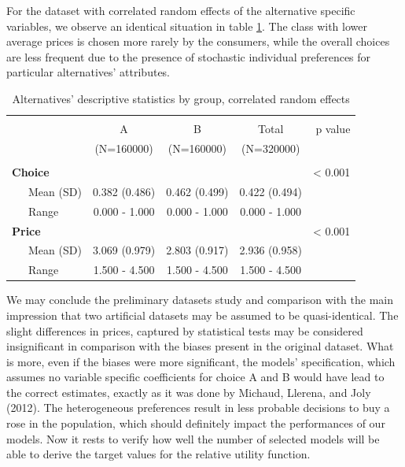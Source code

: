 \documentclass[12pt,]{article}
\begin{document}
For the dataset with correlated random effects of the alternative
specific variables, we observe an identical situation in table
\ref{tab:alt3}. The class with lower average prices is chosen more
rarely by the consumers, while the overall choices are less frequent due
to the presence of stochastic individual preferences for particular
alternatives' attributes.

\begin{table}[!htbp] \centering 
  \caption{Alternatives' descriptive statistics by group, correlated random effects} 
  \label{tab:alt3} 
\begin{tabular}{@{\extracolsep{5pt}}lcccr}
\\[-1.8ex]\hline 
\hline \\[-1.8ex] 
 & A  & B  & Total  & p value\\
 & (N=160000) & (N=160000) & (N=320000) &  \\
\hline \\[-1.8ex] 
\textbf{Choice} &  &  &  & < 0.001\\
~~~Mean (SD) & 0.382 (0.486) & 0.462 (0.499) & 0.422 (0.494) & \\
~~~Range & 0.000 - 1.000 & 0.000 - 1.000 & 0.000 - 1.000 & \\
\textbf{Price} &  &  &  & < 0.001\\
~~~Mean (SD) & 3.069 (0.979) & 2.803 (0.917) & 2.936 (0.958) & \\
~~~Range & 1.500 - 4.500 & 1.500 - 4.500 & 1.500 - 4.500 & \\
\hline
\end{tabular}
\end{table}

We may conclude the preliminary datasets study and comparison with the
main impression that two artificial datasets may be assumed to be
quasi-identical. The slight differences in prices, captured by
statistical tests may be considered insignificant in comparison with the
biases present in the original dataset. What is more, even if the biases
were more significant, the models' specification, which assumes no
variable specific coefficients for choice A and B would have lead to the
correct estimates, exactly as it was done by Michaud, Llerena, and Joly
(2012). The heterogeneous preferences result in less probable decisions
to buy a rose in the population, which should definitely impact the
performances of our models. Now it rests to verify how well the number
of selected models will be able to derive the target values for the
relative utility function.
\end{document}
